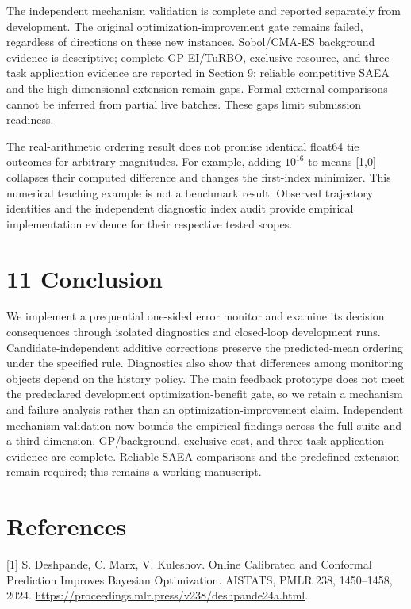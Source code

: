 \documentclass[11pt,a4paper]{article}
\begin{document}
The independent mechanism validation is complete and reported separately
from development. The original optimization-improvement gate remains
failed, regardless of directions on these new instances. Sobol/CMA-ES
background evidence is descriptive; complete GP-EI/TuRBO, exclusive
resource, and three-task application evidence are reported in Section 9;
reliable competitive SAEA and the high-dimensional extension remain
gaps. Formal external comparisons cannot be inferred from partial live
batches. These gaps limit submission readiness.

The real-arithmetic ordering result does not promise identical float64
tie outcomes for arbitrary magnitudes. For example, adding \(10^{16}\)
to means {[}1,0{]} collapses their computed difference and changes the
first-index minimizer. This numerical teaching example is not a
benchmark result. Observed trajectory identities and the independent
diagnostic index audit provide empirical implementation evidence for
their respective tested scopes.

\hypertarget{conclusion}{%
\section{11 Conclusion}\label{conclusion}}

We implement a prequential one-sided error monitor and examine its
decision consequences through isolated diagnostics and closed-loop
development runs. Candidate-independent additive corrections preserve
the predicted-mean ordering under the specified rule. Diagnostics also
show that differences among monitoring objects depend on the history
policy. The main feedback prototype does not meet the predeclared
development optimization-benefit gate, so we retain a mechanism and
failure analysis rather than an optimization-improvement claim.
Independent mechanism validation now bounds the empirical findings
across the full suite and a third dimension. GP/background, exclusive
cost, and three-task application evidence are complete. Reliable SAEA
comparisons and the predefined extension remain required; this remains a
working manuscript.

\hypertarget{references}{%
\section{References}\label{references}}

{[}1{]} S. Deshpande, C. Marx, V. Kuleshov. Online Calibrated and
Conformal Prediction Improves Bayesian Optimization. AISTATS, PMLR 238,
1450--1458, 2024.
\url{https://proceedings.mlr.press/v238/deshpande24a.html}.
\end{document}
